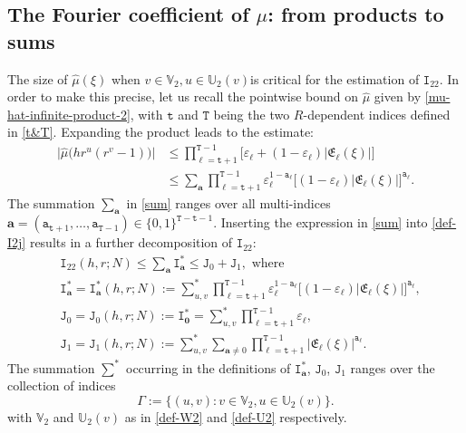 \documentclass[12pt, twoside]{article}
\theoremstyle{definition}
\numberwithin{equation}{section}
\begin{document}
\subsection{The Fourier coefficient of $\mu$: from products to sums} 
The size of $\widehat{\mu}(\xi)$ when $v \in \mathbb V_2, u\in \mathbb U_2(v)$is critical for the estimation of $\mathtt I_{22}$. In order to make this precise, let us recall the pointwise bound on $\widehat{\mu}$ given by \eqref{mu-hat-infinite-product-2}, with $\mathtt t$ and $\mathtt T$ being the two $R$-dependent indices defined in \eqref{t&T}. Expanding the product leads to the estimate:
\begin{align} 
\bigl| \widehat{\mu}\bigl(hr^u(r^v-1) \bigr)\bigr| &\leq \prod_{\ell=\mathtt t+1}^{\mathtt T-1} \bigl[ \varepsilon_{\ell} + (1 - \varepsilon_{\ell}) |\mathfrak E_{\ell}(\xi)| \bigr] \nonumber \\
&\leq  \sum_{\mathbf a} \prod_{\ell=\mathtt t+1}^{\mathtt T-1} \varepsilon_{\ell}^{1 - \mathtt a_{\ell}} \bigl[(1 - \varepsilon_{\ell}) |\mathfrak E_{\ell}(\xi)|\bigr]^{\mathtt a_{\ell}}. \label{sum} 
\end{align}  
The summation $\sum_{\mathbf a}$ in \eqref{sum} ranges over all multi-indices $\mathbf a = (\mathtt a_{\mathtt t+1}, \ldots, \mathtt a_{\mathtt T-1}) \in \{0,1\}^{\mathtt T-\mathtt t-1}$.  Inserting the expression in \eqref{sum} into \eqref{def-I2j} results in a further decomposition of $\mathtt I_{22}$: 
\begin{align}
&\mathtt I_{22} (h, r; N) \leq \sum_{\mathbf a }\mathtt I^{\ast}_{\mathbf a} \leq \mathtt J_0 + \mathtt J_1, \text{ where } \label{I22-decomp} \\ 
&\mathtt I^{\ast}_{\mathbf a} = \mathtt I^{\ast}_{\mathbf a}(h, r; N) := \sum_{u,v}^{\ast}
\prod_{\ell=\mathtt t+1}^{\mathtt T-1} \varepsilon_{\ell}^{1 - \mathtt a_{\ell}} \bigl[(1 - \varepsilon_{\ell}) |\mathfrak E_{\ell}(\xi)|\bigr]^{\mathtt a_{\ell}}, \nonumber \\
&\mathtt J_0 = \mathtt J_0(h, r; N) := \mathtt I_{\mathbf 0}^{\ast} = 
\sum_{u,v}^{\ast} \prod_{\ell=\mathtt t+1}^{\mathtt T-1} \varepsilon_{\ell}, \label{def-J0} \\ &\mathtt J_1 = \mathtt J_1(h, r;N) := 
\sum_{u,v}^{\ast}
\sum_{\mathbf a \ne 0} \prod_{\ell=\mathtt t+1}^{\mathtt T-1} |\mathfrak E_{\ell}(\xi)|^{\mathtt a_{\ell}}. \label{def-J1} 
\end{align} 
The summation ${\overset{\ast}\sum}$ occurring in the definitions of $\mathtt I^{\ast}_{\mathbf a}$, $\mathtt J_0$, $\mathtt J_1$ ranges over the collection of indices 
\begin{equation} \label{def-Gamma}
\Gamma := \{(u,v) : v \in \mathbb V_2, u \in \mathbb U_2(v)\}.
\end{equation}  
with $\mathbb V_2$ and $\mathbb U_2(v)$ as in \eqref{def-W2} and \eqref{def-U2} respectively.  
\end{document}
